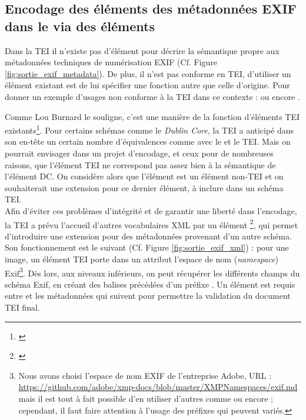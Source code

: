 \subsection{Encodage des éléments des métadonnées EXIF dans le  via des éléments }

Dans la TEI il n'existe pas d'élément pour décrire la sémantique propre aux métadonnées techniques de numérisation EXIF (Cf. Figure \ref{fig:sortie_exif_metadata}). De plus, il n'est pas conforme en TEI, d'utiliser un élément existant est de lui spécifier une fonction autre que celle d'origine. Pour donner un exemple d'usages non conforme à la TEI dans ce contexte :  ou encore . 

Comme Lou Burnard le souligne, c'est une manière de  la fonction d'éléments TEI existants\footnote{\cite{burnard_what_2020}}. Pour certains schémas comme le \textit{Dublin Core}, la TEI a anticipé dans son en-tête un certain nombre d'équivalences comme avec le  et le  TEI. Mais on pourrait envisager dans un projet d'encodage, et ceux pour de nombreuses raisons, que l'élément   TEI ne correspond pas assez bien à la sémantique de l'élément DC. On considère alors que l'élément  est un élément non-TEI et on souhaiterait une extension pour ce dernier élément, à inclure dans un schéma TEI.\\

Afin d'éviter ces problèmes d'intégrité et de garantir une liberté dans l'encodage, la TEI a prévu l'accueil d'autres vocabulaires XML par un élément \footnote{\cite{tei_tei_nodate-16}}, qui permet d'introduire une extension pour des métadonnées provenant d'un autre schéma.\\

Son fonctionnement est le suivant (Cf. Figure \ref{fig:sortie_exif_xml}) : pour une image, un élément TEI  porte dans un attribut  l'espace de nom (\textit{namespace}) Exif\footnote{Nous avons choisi l'espace de nom EXIF de l'entreprise Adobe, URL : \url{https://github.com/adobe/xmp-docs/blob/master/XMPNamespaces/exif.md} mais il est tout à fait possible d'en utiliser d'autres comme  ou encore ; cependant, il faut faire attention à l'usage des préfixes qui peuvent variés.}. Dès lors, aux niveaux inférieurs, on peut récupérer les différents champs du schéma Exif, en créant des balises précédées d'un préfixe . Un élément  est requis entre  et les métadonnées qui suivent pour permettre la validation du document TEI final.

